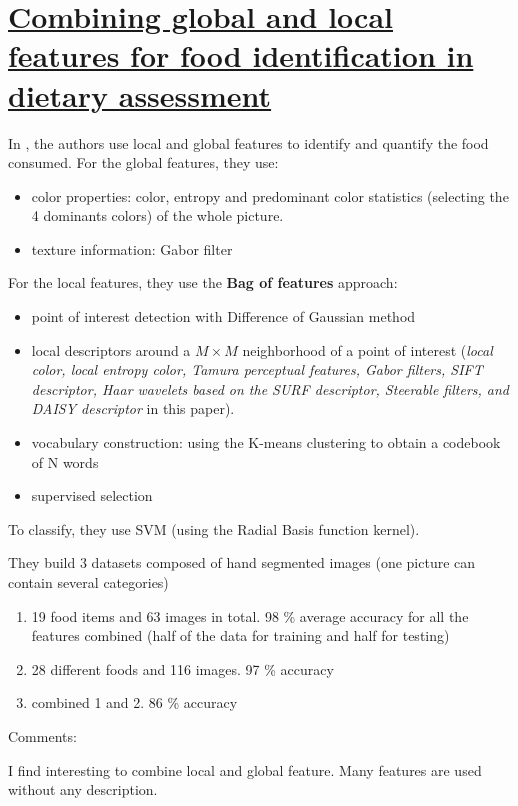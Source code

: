 \section{\href{http://ieeexplore.ieee.org/lpdocs/epic03/wrapper.htm?arnumber=6115809}{Combining global and local features for food identification in dietary assessment}}

In \cite{Bosch2011}, the authors use local and global features to identify and quantify the food consumed.
For the global features, they use:
\begin{itemize}
    \item color properties: color, entropy and predominant color statistics (selecting the 4 dominants colors) of the whole picture.
    \item texture information: Gabor filter
\end{itemize}

For the local features, they use the \textbf{Bag of features} approach:
\begin{itemize}
    \item point of interest detection with Difference of Gaussian method
    \item local descriptors around a $M \times M$ neighborhood of a point of interest (\textit{local color, local entropy color, Tamura perceptual features, Gabor filters, SIFT descriptor, Haar wavelets based on the SURF descriptor, Steerable filters, and DAISY descriptor} in this paper).
    \item vocabulary construction: using the K-means clustering to obtain a codebook of N words
    \item supervised selection
\end{itemize}

To classify, they use SVM (using the Radial Basis function kernel).

They build 3 datasets composed of hand segmented images (one picture can contain several categories)
\begin{enumerate}
    \item 19 food items and 63 images in total. 98 \% average accuracy for all the features combined (half of the data for training and half for testing)
    \item 28 different foods and 116 images. 97 \% accuracy
    \item combined 1 and 2. 86 \% accuracy
\end{enumerate}

Comments:

I find interesting to combine local and global feature. Many features are used without any description.

